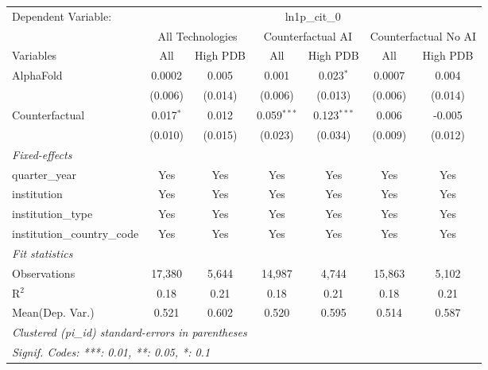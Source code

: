 \begingroup
\centering
\begin{tabular}{lcccccc}
   \tabularnewline \midrule \midrule
   Dependent Variable: & \multicolumn{6}{c}{ln1p\_cit\_0}\\
 & \multicolumn{2}{c}{All Technologies} & \multicolumn{2}{c}{Counterfactual AI} & \multicolumn{2}{c}{Counterfactual No AI} \\
\cmidrule(lr){1-1}\cmidrule(lr){2-3} \cmidrule(lr){4-5} \cmidrule(lr){6-7}
Variables & \multicolumn{1}{c}{All} & \multicolumn{1}{c}{High PDB} & \multicolumn{1}{c}{All} & \multicolumn{1}{c}{High PDB} & \multicolumn{1}{c}{All} & \multicolumn{1}{c}{High PDB} \\
\cmidrule(lr){1-1}\cmidrule(lr){2-2} \cmidrule(lr){3-3} \cmidrule(lr){4-4} \cmidrule(lr){5-5} \cmidrule(lr){6-6} \cmidrule(lr){7-7}
   AlphaFold                    & 0.0002      & 0.005   & 0.001         & 0.023$^{*}$   & 0.0007  & 0.004\\   
                                & (0.006)     & (0.014) & (0.006)       & (0.013)       & (0.006) & (0.014)\\   
   Counterfactual               & 0.017$^{*}$ & 0.012   & 0.059$^{***}$ & 0.123$^{***}$ & 0.006   & -0.005\\   
                                & (0.010)     & (0.015) & (0.023)       & (0.034)       & (0.009) & (0.012)\\   
   \midrule
   \emph{Fixed-effects}\\
   quarter\_year                & Yes         & Yes     & Yes           & Yes           & Yes     & Yes\\  
   institution                  & Yes         & Yes     & Yes           & Yes           & Yes     & Yes\\  
   institution\_type            & Yes         & Yes     & Yes           & Yes           & Yes     & Yes\\  
   institution\_country\_code   & Yes         & Yes     & Yes           & Yes           & Yes     & Yes\\  
   \midrule
   \emph{Fit statistics}\\
   Observations                 & 17,380      & 5,644   & 14,987        & 4,744         & 15,863  & 5,102\\  
   R$^2$                        & 0.18        & 0.21    & 0.18          & 0.21          & 0.18    & 0.21\\  
Mean(Dep. Var.) & 0.521 & 0.602 & 0.520 & 0.595 & 0.514 & 0.587 \\
   \midrule \midrule
   \multicolumn{7}{l}{\emph{Clustered (pi\_id) standard-errors in parentheses}}\\
   \multicolumn{7}{l}{\emph{Signif. Codes: ***: 0.01, **: 0.05, *: 0.1}}\\
\end{tabular}
\par\endgroup
